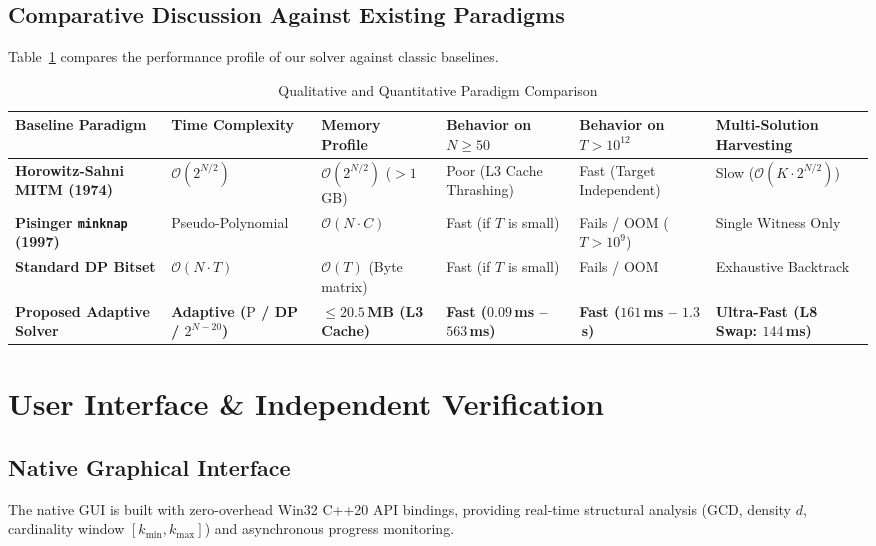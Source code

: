 \documentclass[journal,onecolumn,11pt]{IEEEtran}
\begin{document}
\subsection{Comparative Discussion Against Existing Paradigms}
Table~\ref{tab:comparison} compares the performance profile of our solver against classic baselines.

\begin{table}[t]
\centering
\caption{Qualitative and Quantitative Paradigm Comparison}
\label{tab:comparison}
\renewcommand{\arraystretch}{1.2}
\begin{tabular}{llllll}
\hline
\textbf{Baseline Paradigm} & \textbf{Time Complexity} & \textbf{Memory Profile} & \textbf{Behavior on $N \ge 50$} & \textbf{Behavior on $T > 10^{12}$} & \textbf{Multi-Solution Harvesting} \\
\hline
\textbf{Horowitz-Sahni MITM (1974)} & $\mathcal{O}(2^{N/2})$ & $\mathcal{O}(2^{N/2})$ ($>1$\,GB) & Poor (L3 Cache Thrashing) & Fast (Target Independent) & Slow ($\mathcal{O}(K \cdot 2^{N/2})$) \\
\textbf{Pisinger \texttt{minknap} (1997)} & Pseudo-Polynomial & $\mathcal{O}(N \cdot C)$ & Fast (if $T$ is small) & Fails / OOM ($T > 10^9$) & Single Witness Only \\
\textbf{Standard DP Bitset} & $\mathcal{O}(N \cdot T)$ & $\mathcal{O}(T)$ (Byte matrix) & Fast (if $T$ is small) & Fails / OOM & Exhaustive Backtrack \\
\textbf{Proposed Adaptive Solver} & \textbf{Adaptive ($\text{P}$ / DP / $2^{N-20}$)} & \textbf{$\le 20.5$\,MB (L3 Cache)} & \textbf{Fast ($0.09$\,ms -- $563$\,ms)} & \textbf{Fast ($161$\,ms -- $1.3$\,s)} & \textbf{Ultra-Fast (L8 Swap: $144$\,ms)} \\
\hline
\end{tabular}
\end{table}

\section{User Interface \& Independent Verification}
\label{sec:ui_verification}

\subsection{Native Graphical Interface}
The native GUI is built with zero-overhead Win32 C++20 API bindings, providing real-time structural analysis (GCD, density $d$, cardinality window $[k_{\min}, k_{\max}]$) and asynchronous progress monitoring.
\end{document}
